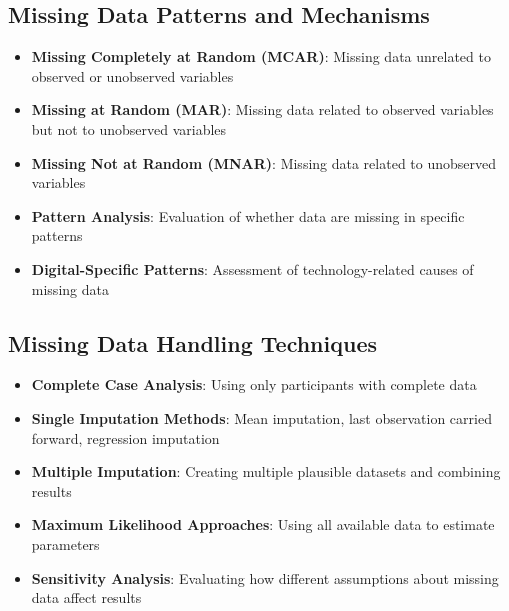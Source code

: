 \subsection{Missing Data Patterns and Mechanisms}
\begin{itemize}
    \item \textbf{Missing Completely at Random (MCAR)}: Missing data unrelated to observed or unobserved variables
    
    \item \textbf{Missing at Random (MAR)}: Missing data related to observed variables but not to unobserved variables
    
    \item \textbf{Missing Not at Random (MNAR)}: Missing data related to unobserved variables
    
    \item \textbf{Pattern Analysis}: Evaluation of whether data are missing in specific patterns
    
    \item \textbf{Digital-Specific Patterns}: Assessment of technology-related causes of missing data
\end{itemize}

\subsection{Missing Data Handling Techniques}
\begin{itemize}
    \item \textbf{Complete Case Analysis}: Using only participants with complete data
    
    \item \textbf{Single Imputation Methods}: Mean imputation, last observation carried forward, regression imputation
    
    \item \textbf{Multiple Imputation}: Creating multiple plausible datasets and combining results
    
    \item \textbf{Maximum Likelihood Approaches}: Using all available data to estimate parameters
    
    \item \textbf{Sensitivity Analysis}: Evaluating how different assumptions about missing data affect results
\end{itemize}

